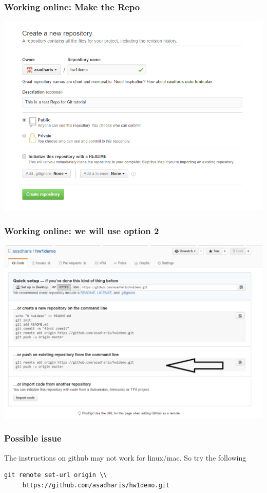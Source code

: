 \documentclass{beamer}
\begin{document}
\begin{frame}
\centering
\frametitle{Working online: Make the Repo}
\includegraphics[scale = 0.4]{makerepo}
\end{frame}

\begin{frame}
\centering
\frametitle{Working online: we will use option 2}
\includegraphics[scale = 0.37]{makerepo2}
\end{frame}


\begin{frame}[fragile]
\frametitle{Possible issue}
The instructions on github may not work for linux/mac. So try the following 
\begin{verbatim}
git remote set-url origin \\
	 https://github.com/asadharis/hw1demo.git
\end{verbatim}
\end{frame}
\end{document}
